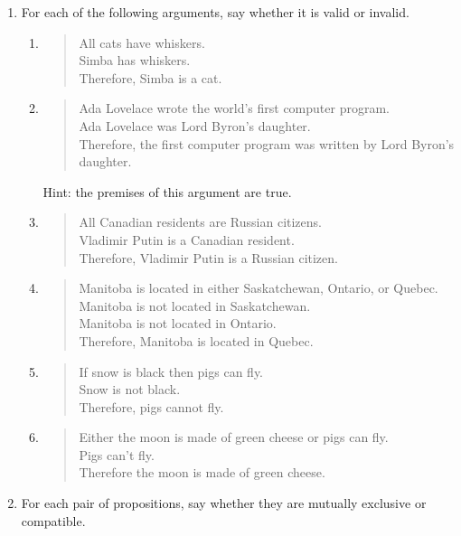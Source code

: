 \documentclass[justified]{tufte-book}
\newenvironment{argument}{\begin{quote}\normalsize}{\end{quote}}
\theoremstyle{definition}
\theoremstyle{definition}
\theoremstyle{definition}
\theoremstyle{remark}
\begin{document}
\begin{enumerate}
\item
  For each of the following arguments, say whether it is valid or
  invalid.

  \begin{enumerate}
  \def\labelenumii{\alph{enumii}.}
  \item
    \begin{argument}
    All cats have whiskers.\\
    Simba has whiskers.\\
    Therefore, Simba is a cat.
    \end{argument}
  \item
    \begin{argument}
    Ada Lovelace wrote the world's first computer program.\\
    Ada Lovelace was Lord Byron's daughter.\\
    Therefore, the first computer program was written by Lord Byron's
    daughter.
    \end{argument}

    Hint: the premises of this argument are true.
  \item
    \begin{argument}
    All Canadian residents are Russian citizens.\\
    Vladimir Putin is a Canadian resident.\\
    Therefore, Vladimir Putin is a Russian citizen.
    \end{argument}
  \item
    \begin{argument}
    Manitoba is located in either Saskatchewan, Ontario, or Quebec.\\
    Manitoba is not located in Saskatchewan.\\
    Manitoba is not located in Ontario.\\
    Therefore, Manitoba is located in Quebec.
    \end{argument}
  \item
    \begin{argument}
    If snow is black then pigs can fly.\\
    Snow is not black.\\
    Therefore, pigs cannot fly.
    \end{argument}
  \item
    \begin{argument}
    Either the moon is made of green cheese or pigs can fly.\\
    Pigs can't fly.\\
    Therefore the moon is made of green cheese.\\
    \end{argument}
  \end{enumerate}
\item
  For each pair of propositions, say whether they are mutually exclusive
  or compatible.


\end{enumerate}
\end{document}
